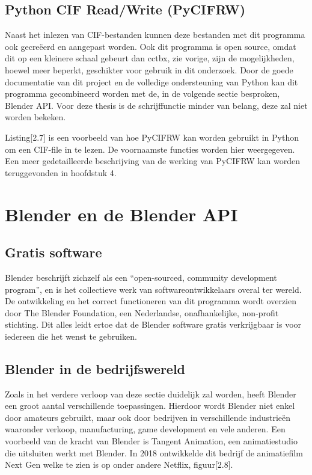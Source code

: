 \subsection{Python CIF Read/Write (PyCIFRW)}
Naast het inlezen van CIF-bestanden kunnen deze bestanden met dit programma ook gecreëerd en aangepast worden. Ook dit programma is open source, omdat dit op een kleinere schaal gebeurt dan cctbx, zie vorige, zijn de mogelijkheden, hoewel meer beperkt, geschikter voor gebruik in dit onderzoek. Door de goede documentatie van dit project en de volledige ondersteuning van Python kan dit programma gecombineerd worden met de, in de volgende sectie besproken, Blender API. \citep*{PYCIFRW1} Voor deze thesis is de schrijffunctie minder van belang, deze zal niet worden bekeken. 

\lstset{caption = Werken met PyCIFRW in Python3}


\par 
Listing[2.7] is een voorbeeld van hoe PyCIFRW kan worden gebruikt in Python om een CIF-file in te lezen. De voornaamste functies worden hier weergegeven. Een meer gedetailleerde beschrijving van de werking van PyCIFRW kan worden teruggevonden in hoofdstuk 4.

\section{Blender en de Blender API}

\subsection{Gratis software}
Blender beschrijft zichzelf als een \enquote{open-sourced, community development program}, en is het collectieve werk van softwareontwikkelaars overal ter wereld. \citep*{BLEN1} De ontwikkeling en het correct functioneren van dit programma wordt overzien door The Blender Foundation, een Nederlandse, onafhankelijke, non-profit stichting. Dit alles leidt ertoe dat de Blender software gratis verkrijgbaar is voor iedereen die het wenst te gebruiken.

\subsection{Blender in de bedrijfswereld}
Zoals in het verdere verloop van deze sectie duidelijk zal worden, heeft Blender een groot aantal verschillende toepassingen. Hierdoor wordt Blender niet enkel door amateurs gebruikt, maar ook door bedrijven in verschillende industrieën waaronder verkoop, manufacturing, game development en vele anderen. Een voorbeeld van de kracht van Blender is Tangent Animation, een animatiestudio die uitsluiten werkt met Blender. In 2018 ontwikkelde dit bedrijf de animatiefilm Next Gen welke te zien is op onder andere Netflix, figuur[2.8].
\par


